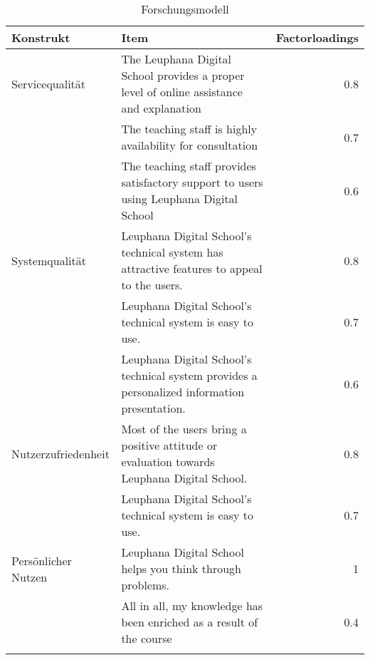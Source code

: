 \begin{table}[ht] 
\footnotesize
\caption{Forschungsmodell}
\label{tab:Forschungsmodell} 
\begin{tabular}{@{}llr@{}} \toprule

\textbf{Konstrukt} & \textbf{Item} & \textbf{Factorloadings} \\ \midrule

Servicequalität & \parbox[t]{10cm}{The Leuphana Digital School provides a proper level of online assistance and explanation} & 0.8\\ \addlinespace
& The teaching staff is highly availability for consultation & 0.7 \\\addlinespace
& \parbox[t]{10cm}{The teaching staff provides satisfactory support to users using Leuphana Digital School} & 0.6 \\ \addlinespace
Systemqualität & \parbox[t]{10cm}{Leuphana Digital School’s technical system has attractive features to appeal to the users.} & 0.8\\ \addlinespace
& Leuphana Digital School’s technical system is easy to use. & 0.7 \\\addlinespace
& \parbox[t]{10cm}{Leuphana Digital School’s technical system provides a personalized information presentation.} & 0.6 \\ \addlinespace
Nutzerzufriedenheit & \parbox[t]{10cm}{Most of the users bring a positive attitude or evaluation towards Leuphana Digital School.} & 0.8\\ \addlinespace
& Leuphana Digital School’s technical system is easy to use. & 0.7 \\ \addlinespace 
Persönlicher Nutzen & \parbox[t]{10cm}{Leuphana Digital School helps you think through problems.}  & 1\\ \addlinespace 
& \parbox[t]{10cm}{All in all, my knowledge has been enriched as a result of the course} & 0.4 \\ \addlinespace 
  \bottomrule

\end{tabular}	
\end{table}



